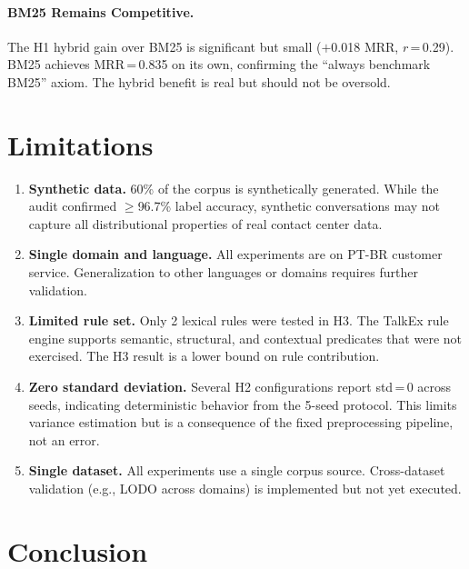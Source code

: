 \documentclass[11pt]{article}
\begin{document}
\paragraph{BM25 Remains Competitive.} The H1 hybrid gain over BM25 is significant but small ($+$0.018 MRR, $r$\,=\,0.29). BM25 achieves MRR\,=\,0.835 on its own, confirming the ``always benchmark BM25'' axiom. The hybrid benefit is real but should not be oversold.


\section{Limitations}
\label{sec:limitations}

\begin{enumerate}[leftmargin=*,itemsep=2pt]
    \item \textbf{Synthetic data.} 60\% of the corpus is synthetically generated. While the audit confirmed $\geq$96.7\% label accuracy, synthetic conversations may not capture all distributional properties of real contact center data.
    \item \textbf{Single domain and language.} All experiments are on PT-BR customer service. Generalization to other languages or domains requires further validation.
    \item \textbf{Limited rule set.} Only 2 lexical rules were tested in H3. The TalkEx rule engine supports semantic, structural, and contextual predicates that were not exercised. The H3 result is a lower bound on rule contribution.
    \item \textbf{Zero standard deviation.} Several H2 configurations report std\,=\,0 across seeds, indicating deterministic behavior from the 5-seed protocol. This limits variance estimation but is a consequence of the fixed preprocessing pipeline, not an error.
    \item \textbf{Single dataset.} All experiments use a single corpus source. Cross-dataset validation (e.g., LODO across domains) is implemented but not yet executed.
\end{enumerate}


\section{Conclusion}
\label{sec:conclusion}
\end{document}
